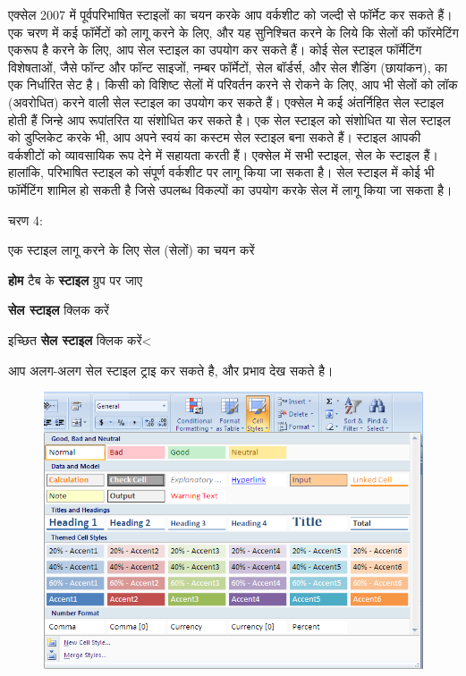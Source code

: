 एक्सेल 2007 में पूर्वपरिभाषित स्टाइलों का चयन करके आप वर्कशीट को जल्दी से फॉर्मेट कर सकते हैं। एक चरण में कई फॉर्मेटों को लागू करने के लिए, और यह सुनिश्चित करने के लिये कि सेलों की फॉरमेटिंग एकरूप है करने के लिए, आप सेल स्टाइल का उपयोग कर सकते हैं। कोई सेल स्टाइल फॉर्मेटिंग विशेषताओं, जैसे फॉन्ट और फॉन्ट साइजों, नम्बर फॉर्मेटों, सेल बॉर्डर्स, और सेल शैडिंग (छायांकन), का एक निर्धारित सेट है। किसी को विशिष्ट सेलों में परिवर्तन करने से रोकने के लिए, आप भी सेलों को लॉक (अवरोधित) करने वाली सेल स्टाइल का उपयोग कर सकते हैं। एक्सेल मे कई अंतर्निहित सेल स्टाइल होती हैं जिन्हे आप रूपांतरित या संशोधित कर सकते है। एक सेल स्टाइल को संशोधित या सेल स्टाइल को डुप्लिकेट करके भी, आप अपने स्वयं का कस्टम सेल स्टाइल बना सकते हैं। स्टाइल आपकी वर्कशीटों को व्यावसायिक रूप देने में सहायता करती हैं। एक्सेल में सभी स्टाइल, सेल के स्टाइल हैं। हालांकि, परिभाषित स्टाइल को संपूर्ण वर्कशीट पर लागू किया जा सकता है। सेल स्टाइल में कोई भी फॉर्मेटिंग शामिल हो सकती है जिसे उपलब्ध विकल्पों का उपयोग करके सेल में लागू किया जा सकता है।

\begin{descriptionSimple}{चरण 4:}
\item[चरण 1] एक स्टाइल लागू करने के लिए सेल (सेलों) का चयन करें
\item[चरण 2] \textbf{होम} टैब के \textbf{स्टाइल} ग्रुप पर जाए
\item[चरण 3] \textbf{सेल स्टाइल} क्लिक करें
\item[चरण 4] इच्छित \textbf{सेल स्टाइल} क्लिक करें<
\end{descriptionSimple}

आप अलग-अलग सेल स्टाइल ट्राइ कर सकते है, और प्रभाव देख सकते है।

\begin{figure}[H]
\centering
\includegraphics[scale=.59]{src/images/chapter2/chapter2_fig18.png}
\end{figure}


